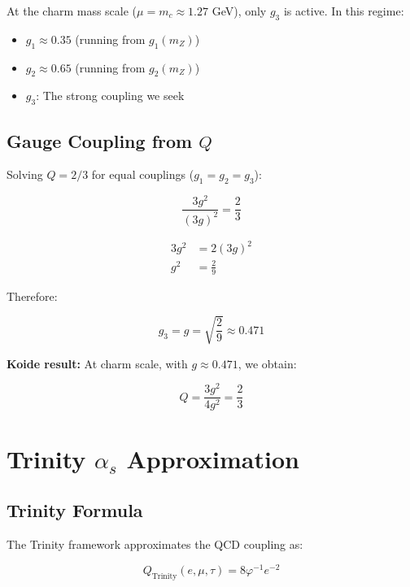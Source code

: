 \documentclass{article}
\begin{document}
At the charm mass scale ($\mu = m_c \approx 1.27$ GeV), only $g_3$ is active. In this regime:

\begin{itemize}
  \item $g_1 \approx 0.35$ (running from $g_1(m_Z)$)
  \item $g_2 \approx 0.65$ (running from $g_2(m_Z)$)
  \item $g_3$: The strong coupling we seek
\end{itemize}

\subsection{Gauge Coupling from $Q$}

Solving $Q = 2/3$ for equal couplings ($g_1 = g_2 = g_3$):

\begin{equation}
  \frac{3g^2}{(3g)^2} = \frac{2}{3}
  \label{eq:equal-couplings}
\end{equation}

\begin{align}
  3g^2 &= 2(3g)^2 \\
  g^2 &= \frac{2}{9}
\end{align}

Therefore:

\begin{equation}
  g_3 = g = \sqrt{\frac{2}{9}} \approx 0.471
  \label{eq:koide-g}
\end{equation}

\textbf{Koide result:} At charm scale, with $g \approx 0.471$, we obtain:

\begin{equation}
  Q = \frac{3g^2}{4g^2} = \frac{2}{3}
  \label{eq:koide-result}
\end{equation}

\section{Trinity $\alpha_s$ Approximation}

\subsection{Trinity Formula}

The Trinity framework approximates the QCD coupling as:

\begin{equation}
  Q_{\text{Trinity}}(e, \mu, \tau) = 8\varphi^{-1}e^{-2}
  \label{eq:trinity-Q}
\end{equation}
\end{document}
